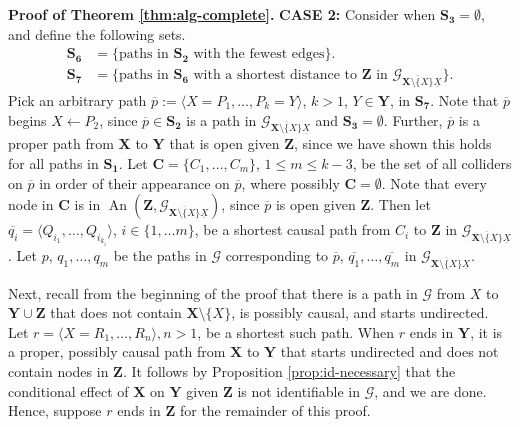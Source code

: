 \documentclass[11pt]{article}
\DeclareMathOperator{\An}{An}
\newcommand{\mb}[1]{\mathbf{#1}}
\newcommand{\g}[1][G]{\mathcal{#1}}
\newenvironment{proofofnoqed}[1][]{\noindent \textbf{Proof of #1.}}{}
\begin{document}
\begin{proofofnoqed}[Theorem \ref{thm:alg-complete}]
    \noindent
    \textbf{CASE 2:}
    Consider when $\mb{S_3} = \emptyset$, and define the following sets.
    \begin{align*}
        \mb{S_6} &= \{ \text{paths in $\mb{S_2}$ with the fewest edges} \}.\\
        \mb{S_7} &= \{ \text{paths in $\mb{S_6}$ with a shortest distance to $\mb{Z}$ in $\g_{\overline{\mb{X} \setminus \{X\}} \underline{X}}$} \}.
    \end{align*}
    Pick an arbitrary path $\overline{p} := \langle X = P_1, \dots, P_k = Y \rangle$, $k > 1$, $Y \in \mb{Y}$, in $\mb{S_7}$. Note that $\overline{p}$ begins $X \gets P_2$, since $\overline{p} \in \mb{S_2}$ is a path in $\g_{\overline{\mb{X} \setminus \{X\}} \underline{X}}$ and $\mb{S_3} = \emptyset$. Further, $\overline{p}$ is a proper path from $\mb{X}$ to $\mb{Y}$ that is open given $\mb{Z}$, since we have shown this holds for all paths in $\mb{S_1}$. Let $\mb{C} = \{C_1, \dots, C_m \}$, $1 \le m \le k-3$, be the set of all colliders on $\overline{p}$ in order of their appearance on $\overline{p}$, where possibly $\mb{C} = \emptyset$. Note that every node in $\mb{C}$ is in $\An(\mb{Z},\g_{\overline{\mb{X} \setminus \{X\}} \underline{X}})$, since $\overline{p}$ is open given $\mb{Z}$. Then let $\overline{q_i} = \langle Q_{i_1}, \dots, Q_{i_{k_i}} \rangle$, $i \in \{1, \dots m\}$, be a shortest causal path from $C_i$ to $\mb{Z}$ in $\g_{\overline{\mb{X} \setminus \{X\}} \underline{X}}$. Let $p$, $q_1, \dots, q_m$ be the paths in $\g$ corresponding to $\overline{p}$, $\overline{q_1}, \dots, \overline{q_m}$ in $\g_{\overline{\mb{X} \setminus \{X\}} \underline{X}}$.

    Next, recall from the beginning of the proof that there is a path in $\g$ from $X$ to $\mb{Y} \cup \mb{Z}$ that does not contain $\mb{X} \setminus \{X\}$, is possibly causal, and starts undirected. Let $r = \langle X = R_1, \dots, R_n \rangle, n >1$, be a shortest such path. When $r$ ends in $\mb{Y}$, it is a proper, possibly causal path from $\mb{X}$ to $\mb{Y}$ that starts undirected and does not contain nodes in $\mb{Z}$. It follows by Proposition \ref{prop:id-necessary} that the conditional effect of $\mb{X}$ on $\mb{Y}$ given $\mb{Z}$ is not identifiable in $\g$, and we are done. Hence, suppose $r$ ends in $\mb{Z}$ for the remainder of this proof.


\end{proofofnoqed}
\end{document}
